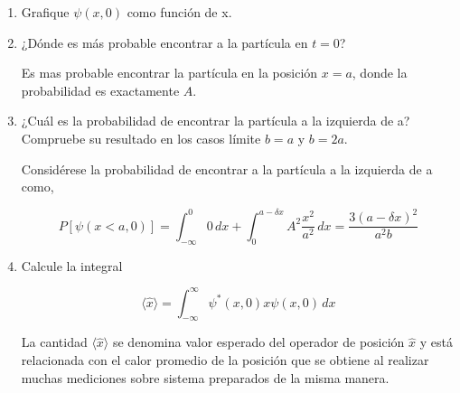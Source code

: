 \documentclass[12pt,a4paper]{article}
\begin{document}
\begin{enumerate}
\begin{enumerate}
\[
A^{2}\left[ \frac{a(b-a)^{2}+3\left( \frac{b^{3}}{3}-b^{2}a+ba^{2} +\frac{a^{3}}{3}\right)}{3(b-a)^{2}} \right] = 1
\]

\[
A^{2}\left( \frac{a(b-a)^{2}+b^{3}-3ab^{2}+3a^{2}b+a^{3}}{3(b-a)^{2}} \right) = 1
\]

\[
A^{2}\left( \frac{a(b-a)^{2}+(b-a)^{3}}{3(b-a)^{2}} \right) = 1
\]

\[
A^{2}\left[ \frac{\cancel{(b-a)^{2}}(a+(b-a))}{3\cancel{(b-a)^{2}}} \right] = 1
\]

\[
A^{2}\frac{b}{3} = 1
\]

\[
\therefore A = \sqrt{\frac{3}{b}}
\]

\item Grafique $ \psi(x,0) $ como función de x.

\begin{center}
\end{center}



\item ¿Dónde es más probable encontrar a la partícula en $ t=0 $?

Es mas probable encontrar la partícula en la posición $ x=a $, donde la probabilidad es exactamente $ A $.

\item ¿Cuál es la probabilidad de encontrar la partícula a la izquierda de a? Compruebe su resultado en los casos límite $ b=a $ y $ b=2a $.

Considérese la probabilidad de encontrar a la partícula a la izquierda de a como,

\[
P[\psi(x<a, 0)] = \int_{-\infty}^{0} 0 \, dx + \int_{0}^{a-\delta x} A^{2}\frac{x^{2}}{a^{2}} \, dx = \frac{3(a-\delta x)^{2}}{a^{2}b}
\]


\item Calcule la integral

\[
\langle \hat{x} \rangle = \int_{-\infty}^{\infty} \psi^{*}(x, 0)x\psi(x, 0) \, dx
\]

La cantidad $ \langle \hat{x} \rangle  $ se denomina valor esperado del operador de posición $ \hat{x} $ y está relacionada con el calor promedio de la posición que se obtiene al realizar muchas mediciones sobre sistema preparados de la misma manera.


\end{enumerate}
\end{enumerate}
\end{document}
